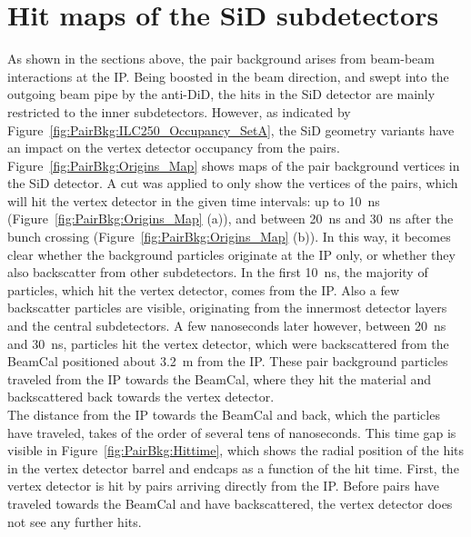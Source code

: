 \section{Hit maps of the SiD subdetectors}
\label{PairBkg:hitmaps}
As shown in the sections above, the \positron\electron pair background arises from beam-beam interactions at the IP.
Being boosted in the beam direction, and swept into the outgoing beam pipe by the anti-DiD, the hits in the SiD detector are mainly restricted to the inner subdetectors.
However, as indicated by Figure~\ref{fig:PairBkg:ILC250_Occupancy_SetA}, the SiD geometry variants have an impact on the vertex detector occupancy from the \positron\electron pairs.
\\Figure~\ref{fig:PairBkg:Origins_Map} shows maps of the pair background vertices in the SiD detector.
A cut was applied to only show the vertices of the pairs, which will hit the vertex detector in the given time intervals: up to \SI{10}{\nano\second} (Figure~\ref{fig:PairBkg:Origins_Map} (a)), and between \SI{20}{\nano\second} and \SI{30}{\nano\second} after the bunch crossing (Figure~\ref{fig:PairBkg:Origins_Map} (b)).
In this way, it becomes clear whether the background particles originate at the IP only, or whether they also backscatter from other subdetectors.
In the first \SI{10}{\nano\second}, the majority of particles, which hit the vertex detector, comes from the IP.
Also a few backscatter particles are visible, originating from the innermost detector layers and the central subdetectors.
A few nanoseconds later however, between \SI{20}{\nano\second} and \SI{30}{\nano\second}, particles hit the vertex detector, which were backscattered from the BeamCal positioned about \SI{3.2}{\meter} from the IP.
These pair background particles traveled from the IP towards the BeamCal, where they hit the material and backscattered back towards the vertex detector.
\\The distance from the IP towards the BeamCal and back, which the particles have traveled, takes of the order of several tens of nanoseconds.
This time gap is visible in Figure~\ref{fig:PairBkg:Hittime}, which shows the radial position of the hits in the vertex detector barrel and endcaps as a function of the hit time.
First, the vertex detector is hit by \positron\electron pairs arriving directly from the IP.
Before pairs have traveled towards the BeamCal and have backscattered, the vertex detector does not see any further hits.

